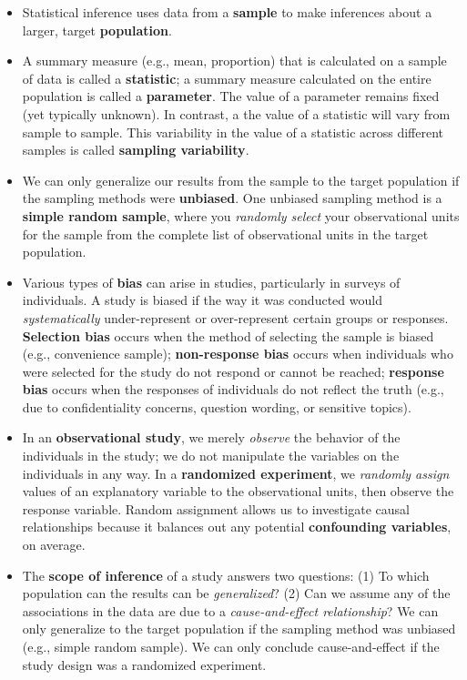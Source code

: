 \documentclass[
  10pt,
  openany]{book}
\theoremstyle{definition}
\theoremstyle{definition}
\theoremstyle{definition}
\theoremstyle{definition}
\theoremstyle{remark}
\begin{document}
\begin{itemize}
\item
  Statistical inference uses data from a \textbf{sample} to make inferences about a larger, target \textbf{population}.
\item
  A summary measure (e.g., mean, proportion) that is calculated on a sample of data is called a \textbf{statistic}; a summary measure calculated on the entire population is called a \textbf{parameter}. The value of a parameter remains fixed (yet typically unknown). In contrast, a the value of a statistic will vary from sample to sample. This variability in the value of a statistic across different samples is called \textbf{sampling variability}.
\item
  We can only generalize our results from the sample to the target population if the sampling methods were \textbf{unbiased}.
  One unbiased sampling method is a \textbf{simple random sample}, where you \emph{randomly select} your observational units for the sample from the complete list of observational units in the target population.
\item
  Various types of \textbf{bias} can arise in studies, particularly in surveys of individuals.
  A study is biased if the way it was conducted would \emph{systematically} under-represent or over-represent certain groups or responses.
  \textbf{Selection bias} occurs when the method of selecting the sample is biased (e.g., convenience sample);
  \textbf{non-response bias} occurs when individuals who were selected for the study do not respond or cannot be reached;
  \textbf{response bias} occurs when the responses of individuals do not reflect the truth (e.g., due to confidentiality concerns, question wording, or sensitive topics).
\item
  In an \textbf{observational study}, we merely \emph{observe} the behavior of the individuals in the study; we do not manipulate the variables on the individuals in any way. In a \textbf{randomized experiment}, we \emph{randomly assign} values of an explanatory variable to the observational units, then observe the response variable. Random assignment allows us to investigate causal relationships because it balances out any potential \textbf{confounding variables}, on average.
\item
  The \textbf{scope of inference} of a study answers two questions: (1) To which population can the results can be \emph{generalized}? (2) Can we assume any of the associations in the data are due to a \emph{cause-and-effect relationship}?
  We can only generalize to the target population if the sampling method was unbiased (e.g., simple random sample).
  We can only conclude cause-and-effect if the study design was a randomized experiment.
\end{itemize}
\end{document}
